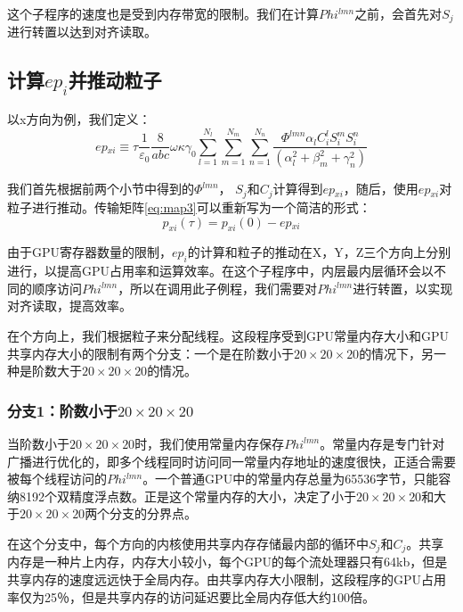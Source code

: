 这个子程序的速度也是受到内存带宽的限制。我们在计算$Phi^{lmn}$之前，会首先对$S_{j}$进行转置以达到对齐读取。

\subsection{计算$ep_i$并推动粒子}
以x方向为例，我们定义：
\begin{equation}
ep{_{xi}}\equiv \tau \frac{1}{{{\varepsilon }_{0}}}\frac{8}{abc}\omega \kappa {{\gamma }_{0}}\sum\limits_{l=1}^{{{N}_{l}}}{\sum\limits_{m=1}^{{{N}_{m}}}{\sum\limits_{n=1}^{{{N}_{n}}}{\frac{\Phi^{lmn}{{\alpha }_{l}}C_{i}^{l}S_{i}^{m}S_{i}^{n}}{(\alpha _{l}^{2}+\beta _{m}^{2}+\gamma _{n}^{2})}}}}
\end{equation}

我们首先根据前两个小节中得到的$\Phi^{lmn}$， $S_{j}^{{}}$和$C_{j}^{{}}$计算得到$ep{_{xi}}$，随后，使用$ep{_{xi}}$对粒子进行推动。传输矩阵\ref{eq:map3}可以重新写为一个简洁的形式：
\begin{equation}\label{eq:map4}
{{p}_{xi}}(\tau )={{p}_{xi}}(0)-ep{_{xi}}
\end{equation}

由于GPU寄存器数量的限制，$ep_{i}$的计算和粒子的推动在X，Y，Z三个方向上分别进行，以提高GPU占用率和运算效率。在这个子程序中，内层最内层循环会以不同的顺序访问$Phi^{lmn}$，所以在调用此子例程，我们需要对$ Phi ^ {lmn} $进行转置，以实现对齐读取，提高效率。

在个方向上，我们根据粒子来分配线程。这段程序受到GPU常量内存大小和GPU共享内存大小的限制有两个分支：一个是在阶数小于$20 \times 20 \times 20$的情况下，另一种是阶数大于$20 \times 20 \times 20$的情况。
\subsubsection{分支1：阶数小于$20 \times 20 \times 20$}
当阶数小于$ 20\times20\times20 $时，我们使用常量内存保存$Phi^{lmn}$。常量内存是专门针对广播进行优化的，即多个线程同时访问同一常量内存地址的速度很快，正适合需要被每个线程访问的$Phi^{lmn}$。一个普通GPU中的常量内存总量为65536字节，只能容纳8192个双精度浮点数。正是这个常量内存的大小，决定了小于$20 \times 20 \times 20$和大于$20 \times 20 \times 20$两个分支的分界点。

在这个分支中，每个方向的内核使用共享内存存储最内部的循环中$ S_ {j} $和$ C_ {j} $。共享内存是一种片上内存，内存大小较小，每个GPU的每个流处理器只有64kb，但是共享内存的速度远远快于全局内存。由共享内存大小限制，这段程序的GPU占用率仅为25％，但是共享内存的访问延迟要比全局内存低大约100倍。


